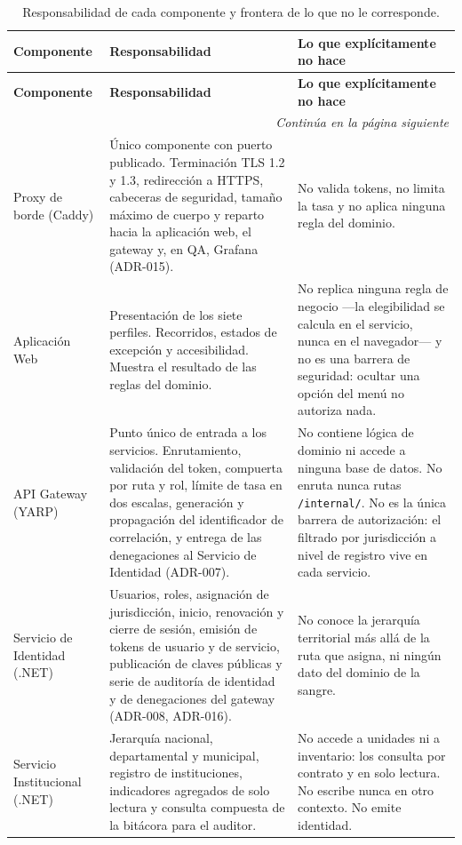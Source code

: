 \documentclass[11pt,a4paper]{article}
\newcommand{\contlinea}[1]{\multicolumn{#1}{r}{\footnotesize\itshape Continúa en la página siguiente}}
\begin{document}
\begin{longtable}{L{3.0cm} L{5.6cm} L{5.6cm}}
\caption{Responsabilidad de cada componente y frontera de lo que no le corresponde.}\label{tab:componentes}\\
\toprule
\textbf{Componente} & \textbf{Responsabilidad} & \textbf{Lo que explícitamente no hace} \\
\midrule
\endfirsthead
\toprule
\textbf{Componente} & \textbf{Responsabilidad} & \textbf{Lo que explícitamente no hace} \\
\midrule
\endhead
\midrule
\contlinea{3} \\
\endfoot
\bottomrule
\endlastfoot
Proxy de borde (Caddy) & Único componente con puerto publicado. Terminación TLS 1.2 y 1.3, redirección a HTTPS, cabeceras de seguridad, tamaño máximo de cuerpo y reparto hacia la aplicación web, el gateway y, en QA, Grafana (ADR-015). & No valida tokens, no limita la tasa y no aplica ninguna regla del dominio. \\
Aplicación Web & Presentación de los siete perfiles. Recorridos, estados de excepción y accesibilidad. Muestra el resultado de las reglas del dominio. & No replica ninguna regla de negocio ---la elegibilidad se calcula en el servicio, nunca en el navegador--- y no es una barrera de seguridad: ocultar una opción del menú no autoriza nada. \\
API Gateway (YARP) & Punto único de entrada a los servicios. Enrutamiento, validación del token, compuerta por ruta y rol, límite de tasa en dos escalas, generación y propagación del identificador de correlación, y entrega de las denegaciones al Servicio de Identidad (ADR-007). & No contiene lógica de dominio ni accede a ninguna base de datos. No enruta nunca rutas \texttt{/internal/}. No es la única barrera de autorización: el filtrado por jurisdicción a nivel de registro vive en cada servicio. \\
Servicio de Identidad (.NET) & Usuarios, roles, asignación de jurisdicción, inicio, renovación y cierre de sesión, emisión de tokens de usuario y de servicio, publicación de claves públicas y serie de auditoría de identidad y de denegaciones del gateway (ADR-008, ADR-016). & No conoce la jerarquía territorial más allá de la ruta que asigna, ni ningún dato del dominio de la sangre. \\
Servicio Institucional (.NET) & Jerarquía nacional, departamental y municipal, registro de instituciones, indicadores agregados de solo lectura y consulta compuesta de la bitácora para el auditor. & No accede a unidades ni a inventario: los consulta por contrato y en solo lectura. No escribe nunca en otro contexto. No emite identidad. \\

\end{longtable}
\end{document}
